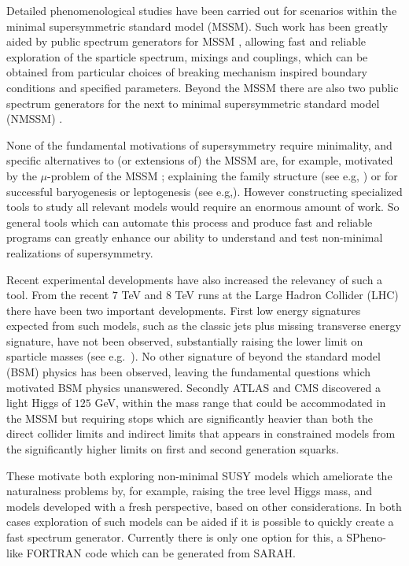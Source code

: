 \documentclass[final,3p,11pt,pdflatex]{elsarticle}
\makeatletter
\newcommand{\sarah}{SARAH\@\xspace}
\makeatother
\begin{document}
Detailed phenomenological studies have been carried out for scenarios
within the minimal supersymmetric standard model (MSSM).  Such work
has been greatly aided by public spectrum generators for
MSSM \cite{Allanach:2001kg,Porod:2003um,Djouadi:2002ze,Baer:1993ae,Chowdhury:2011zr},
allowing fast and reliable exploration of the sparticle spectrum,
mixings and couplings, which can be obtained from particular choices
of breaking mechanism inspired boundary conditions and specified
parameters. Beyond the MSSM there are also two public spectrum
generators \cite{Ellwanger:2006rn,Allanach:2013kza} for the next to
minimal supersymmetric standard model (NMSSM) \cite{NMSSM}.

None of the fundamental motivations of supersymmetry require
minimality, and specific alternatives to (or extensions of) the MSSM
are, for example, motivated by the $\mu$-problem of the
MSSM \cite{Kim:1983dt}; explaining the family structure (see e.g,
\cite{King:2014nza}) or for successful baryogenesis or leptogenesis
(see e.g,\cite{King:2008qb}). However constructing specialized tools
to study all relevant models would require an enormous amount of work.
So general tools which can automate this process and produce fast and
reliable programs can greatly enhance our ability to understand and
test non-minimal realizations of supersymmetry.

Recent experimental developments have also increased the relevancy of
such a tool. From the recent $7$ TeV and $8$ TeV runs at the Large
Hadron Collider (LHC) there have been two important developments.
First low energy signatures expected from such models, such as the
classic jets plus missing transverse energy signature, have not been
observed, substantially raising the lower limit on sparticle masses
(see e.g.~\cite{Aad:2013wta,Chatrchyan:2014lfa}). No other signature
of beyond the standard model (BSM) physics has been observed, leaving
the fundamental questions which motivated BSM physics
unanswered. Secondly ATLAS and CMS discovered \cite{ATLAS:2012ae,
  Chatrchyan:2012tx} a light Higgs of $125$ GeV, within the mass range
that could be accommodated in the MSSM but requiring stops which are
significantly heavier than both the direct collider limits and
indirect limits that appears in constrained models from the
significantly higher limits on first and second generation squarks.

These motivate both exploring non-minimal SUSY models which ameliorate
the naturalness problems by, for example, raising the tree level Higgs
mass, and models developed with a fresh perspective, based on other
considerations.  In both cases exploration of such models can be aided
if it is possible to quickly create a fast spectrum generator.
Currently there is only one option for this, a SPheno-like FORTRAN code
which can be generated from
\sarah \cite{Staub:2010ty,Staub:2009bi,Staub:2010jh,Staub:2012pb,Staub:2013tta}.
\end{document}
